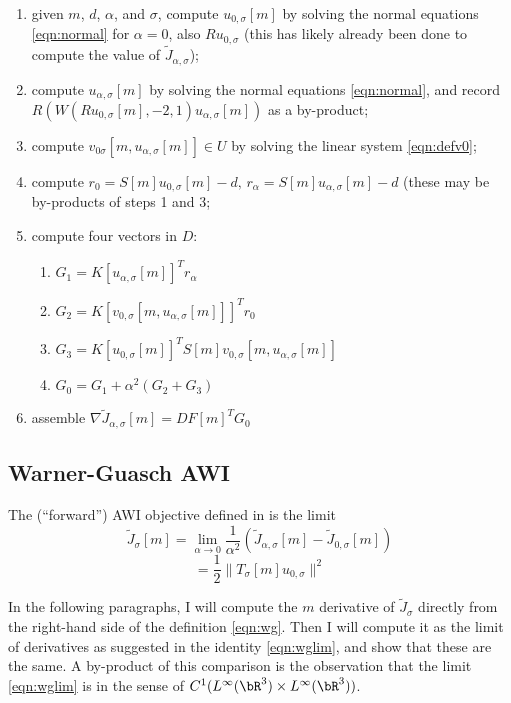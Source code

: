 \begin{enumerate}
\item given $m$, $d$, $\alpha$, and $\sigma$, compute
  $u_{0,\sigma}[m]$ by solving the normal equations \ref{eqn:normal}
  for $\alpha=0$, also $Ru_{0,\sigma}$ (this has
  likely already been done to compute the value of $\tilde{J}_{\alpha,\sigma}$);
\item compute $u_{\alpha,\sigma}[m]$ by
  solving the normal equations \ref{eqn:normal}, and record
  $R(W(Ru_{0,\sigma}[m],-2,1)u_{\alpha,\sigma}[m])$ as a by-product;
\item compute $v_{0\sigma}[m, u_{\alpha,\sigma}[m]] \in U$ by solving the linear system
  \ref{eqn:defv0};
\item compute $r_0 = S[m]u_{0,\sigma}[m]-d,\,r_{\alpha} = S[m]u_{\alpha,\sigma}[m]-d$ (these may be by-products of steps 1 and 3;
\item compute four vectors in $D$:
  \begin{enumerate}
  \item $G_1 = K[u_{\alpha,\sigma}[m]]^T r_{\alpha}$
  \item $G_2 = K[v_{0,\sigma}[m, u_{\alpha,\sigma}[m]]]^Tr_0$
  \item $G_3 = K[u_{0,\sigma}[m]]^T S[m]v_{0,\sigma}[m, u_{\alpha,\sigma}[m]]$
  \item $G_0 = G_1 + \alpha^2 (G_2 + G_3)$
  \end{enumerate}
\item assemble
  $\nabla \tilde{J}_{\alpha,\sigma}[m] = DF[m]^TG_0$
\end{enumerate}

\subsection{Warner-Guasch AWI}
The (``forward'') AWI objective defined in \cite{Warner:16} is
the limit
\begin{equation}
  \label{eqn:wglim}
  \tilde{J}_{\sigma}[m] = \lim_{\alpha \rightarrow 0}
  \frac{1}{\alpha^2}(\tilde{J}_{\alpha,\sigma}[m]-\tilde{J}_{0,\sigma}[m])
\end{equation}
\begin{equation}
  \label{eqn:wg}
  = \frac{1}{2} \|T_{\sigma}[m]u_{0,\sigma}\|^2
\end{equation}

In the following paragraphs, I will compute the $m$ derivative of
$\tilde{J}_{\sigma}$ directly from the right-hand side of the
definition \ref{eqn:wg}. Then I will compute it as the limit of
derivatives as suggested in the identity \ref{eqn:wglim}, and show
that these are the same.  A by-product of this comparison is the
observation that the limit \ref{eqn:wglim} is in the sense of
$C^1(L^{\infty}(\bR^3) \times L^{\infty}(\bR^3))$.

